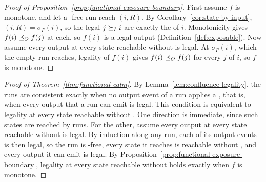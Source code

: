 \begin{proof}[Proof of Proposition~\ref{prop:functional-exposure-boundary}]
First assume $f$ is monotone, and let a \commitment-free run reach $(i,R)$.
By Corollary~\ref{cor:state-by-input}, $(i,R)=\sigma_P(i)$, so the legal
$j\succeq_I i$ are exactly the \indescs of $i$.  Monotonicity gives
$f(i)\preceq_O f(j)$ at each, so $f(i)$ is a legal output
(Definition~\ref{def:exposable}).  Now assume every output at every state
reachable without \commitment is legal.  At $\sigma_P(i)$, which the empty run
reaches, legality of $f(i)$ gives $f(i)\preceq_O f(j)$ for every \indesc $j$
of $i$, so $f$ is monotone.
\end{proof}

\begin{proof}[Proof of Theorem~\ref{thm:functional-calm}]
By Lemma~\ref{lem:confluence-legality}, the runs are consistent exactly when
no output event of a run applies a \commitment, that is, when every output that
a run can emit is legal.  This condition is equivalent to legality at every
state reachable without \commitment.  One direction is immediate, since such
states are reached by runs.  For the other, assume every output at every
state reachable without \commitment is legal.  By induction along any run,
each of its output events is then legal, so the run is \commitment-free, every
state it reaches is reachable without \commitment, and every output it can
emit is legal.  By
Proposition~\ref{prop:functional-exposure-boundary}, legality at every state
reachable without \commitment holds exactly when $f$ is monotone.
\end{proof}
